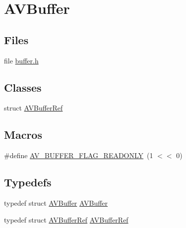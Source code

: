 \hypertarget{group__lavu__buffer}{}\section{A\+V\+Buffer}
\label{group__lavu__buffer}
\subsection*{Files}
\begin{DoxyCompactItemize}
\item 
file \hyperlink{ffmpeg_2libavutil_2buffer_8h}{buffer.\+h}
\end{DoxyCompactItemize}
\subsection*{Classes}
\begin{DoxyCompactItemize}
\item 
struct \hyperlink{struct_a_v_buffer_ref}{A\+V\+Buffer\+Ref}
\end{DoxyCompactItemize}
\subsection*{Macros}
\begin{DoxyCompactItemize}
\item 
\#define \hyperlink{group__lavu__buffer_gaa818f8f1011d69acc50c1f29cb85e576}{A\+V\+\_\+\+B\+U\+F\+F\+E\+R\+\_\+\+F\+L\+A\+G\+\_\+\+R\+E\+A\+D\+O\+N\+LY}~(1 $<$$<$ 0)
\end{DoxyCompactItemize}
\subsection*{Typedefs}
\begin{DoxyCompactItemize}
\item 
typedef struct \hyperlink{group__lavu__buffer_ga501d49df442180d584f255aa97b2549d}{A\+V\+Buffer} \hyperlink{group__lavu__buffer_ga501d49df442180d584f255aa97b2549d}{A\+V\+Buffer}
\item 
typedef struct \hyperlink{struct_a_v_buffer_ref}{A\+V\+Buffer\+Ref} \hyperlink{group__lavu__buffer_ga433e680d11ad786bd1bc20f5616c7d19}{A\+V\+Buffer\+Ref}
\end{DoxyCompactItemize}
